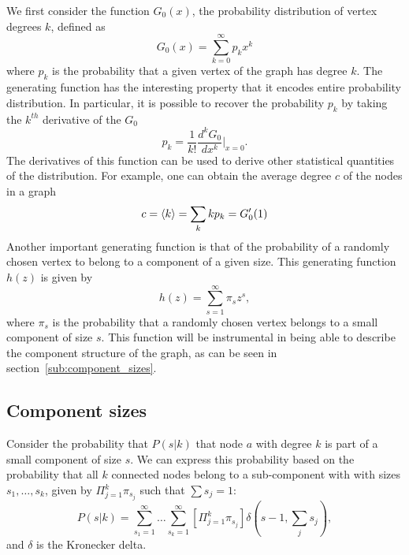We first consider the function $G_0(x)$, the probability distribution of vertex degrees $k$, defined as
\begin{equation}
G_0(x) = \sum_{k=0}^{\infty} p_k x^k
\end{equation}
where $p_k$ is the probability that a given vertex of the graph has degree $k$.
The generating function has the interesting property that it encodes entire probability distribution.
In particular, it is possible to recover the probability $p_k$ by taking the $k^{th}$ derivative of the $G_0$
\begin{equation}
	p_k = \frac{1}{k!} \frac{d^k G_0}{dx^k} \Big|_{x=0}.
\end{equation}
The derivatives of this function can be used to derive other statistical quantities of the distribution.
For example, one can obtain the average degree $c$ of the nodes in a graph
\begin{equation}
	c = \left< k \right> = \sum_k k p_k = G'_0(1)
\end{equation}
Another important generating function is that of the probability of a randomly chosen vertex to belong to a component of a given size.
This generating function $h(z)$ is given by
\begin{equation}
    \label{eq:gen_func_comp_sizes}
	h(z) = \sum_{s=1}^{\infty} \pi_s z^s,
\end{equation}
\noindent where $\pi_s$ is the probability that a randomly chosen vertex belongs to a small component of size $s$.
This function will be instrumental in being able to describe the component structure of the graph, as can be seen in section~\vref{sub:component_sizes}.

\subsection{Component sizes} %
\label{sub:component_sizes}

Consider the probability that $P(s|k)$ that node $a$ with degree $k$ is part of a small component of size $s$.
We can express this probability based on the probability that all $k$ connected nodes belong to a sub-component with with sizes $s_1, \ldots, s_k$, given by $\Pi_{j=1}^{k} \pi_{s_j}$ such that $\sum s_j = 1$:
\begin{equation}
	P(s|k) = \sum_{s_1 = 1}^{\infty} \ldots \sum_{s_k = 1}^{\infty} \left[ \Pi_{j=1}^k \pi_{s_j} \right] \delta(s-1, \sum_j s_j),
\end{equation}
and $\delta$ is the Kronecker delta.

